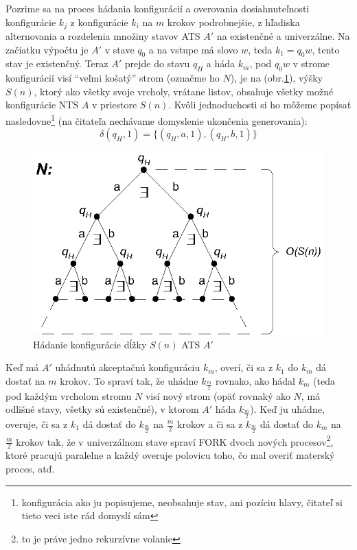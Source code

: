 \begin{dokaz}
  Pozrime sa na proces hádania konfigurácií a overovania
  dosiahnuteľnosti konfigurácie $k_j$ z konfigurácie $k_i$ na $m$
  krokov podrobnejšie, z hľadiska alternovania a rozdelenia množiny
  stavov ATS $A'$ na existenčné a univerzálne. Na začiatku výpočtu
  je $A'$ v stave $q_0$ a na vstupe má slovo $w$, teda $k_1=q_0 w$,
  tento stav je existenčný. Teraz $A'$ prejde do stavu $q_H$ a háda
  $k_m$, pod $q_0 w$ v strome konfigurácií visí ``veľmi košatý''
  strom (označme ho $N$), je na (obr.\ref{strom_n}), výšky $S(n)$,
  ktorý ako všetky svoje vrcholy, vrátane listov, obsahuje všetky
  možné konfigurácie NTS $A$ v priestore $S(n)$. Kvôli jednoduchosti
  si ho môžeme popísať nasledovne\footnote{konfigurácia ako ju
  popisujeme, neobsahuje stav, ani pozíciu hlavy, čitateľ si tieto
  veci iste rád domyslí sám} (na čitateľa nechávame domyslenie
  ukončenia generovania):
  \[
  \delta(q_H,1)=\{(q_H,a,1),(q_H,b,1)\}
  \]

  \begin{figure}[!ht]
    \centering
    \includegraphics{img/strom_n}
    \caption{Hádanie konfigurácie dĺžky $S(n)$ ATS $A'$}
    \label{strom_n}
  \end{figure}

  Keď má $A'$ uhádnutú akceptačnú konfiguráciu $k_m$, overí, či sa z
  $k_1$ do $k_m$ dá dostať na $m$ krokov. To spraví tak, že uhádne
  $k_{\frac{m}{2}}$ rovnako, ako hádal $k_m$ (teda pod každým
  vrcholom stromu $N$ visí nový strom (opäť rovnaký ako $N$, má
  odlišné stavy, všetky sú existenčné), v ktorom $A'$ háda
  $k_\frac{m}{2}$). Keď ju uhádne, overuje, či sa z $k_1$ dá dostať
  do $k_{\frac{m}{2}}$ na $\frac{m}{2}$ krokov a či sa z
  $k_{\frac{m}{2}}$ dá dostať do $k_m$ na $\frac{m}{2}$ krokov tak,
  že v univerzálnom stave spraví FORK dvoch nových
  procesov\footnote{to je práve jedno rekurzívne volanie}, ktoré
  pracujú paralelne a každý overuje polovicu toho, čo mal overiť
  materský proces, atď.


\end{dokaz}
